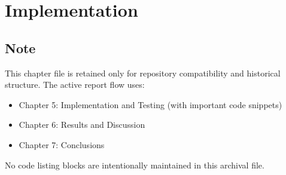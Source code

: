 \chapter{Implementation}

\section{Note}

This chapter file is retained only for repository compatibility and historical structure.
The active report flow uses:
\begin{itemize}
    \item Chapter 5: Implementation and Testing (with important code snippets)
    \item Chapter 6: Results and Discussion
    \item Chapter 7: Conclusions
\end{itemize}

No code listing blocks are intentionally maintained in this archival file.
